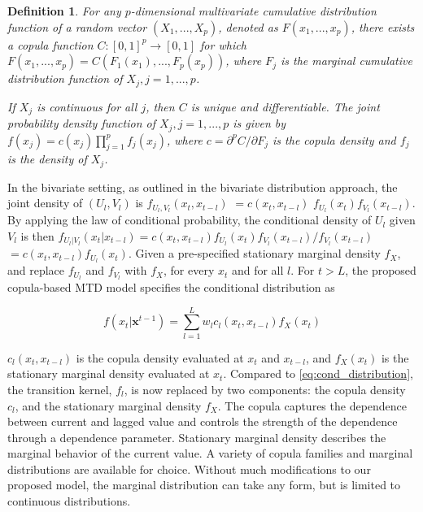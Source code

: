 \documentclass[
  letterpaper,
  double,
  12pt,
  1.0in]{beavtex}
\newtheorem{definition}{Definition}   %
\begin{document}
\begin{definition}
For any $p$-dimensional multivariate cumulative distribution function of a random vector $(X_1, ..., X_p)$, denoted as $F(x_1, ..., x_p)$, there exists a copula function $C: {[0,1]}^p \rightarrow [0, 1]$ for which $F(x_1, ..., x_p) = C(F_1(x_1), ..., F_p(x_p))$, where $F_j$ is the marginal cumulative distribution function of $X_j, j = 1,..., p$.

If $X_j$ is continuous for all $j$, then $C$ is unique and differentiable. The joint probability density function of $X_j, j=1,...,p$ is given by $f(x_j) = c(x_j) \prod_{j=1}^p f_j(x_j)$, where $c = \partial^p{C} / \partial{F_j}$ is the copula density and $f_j$ is the density of $X_j$.
\label{def:copula}
\end{definition}

In the bivariate setting, as outlined in the bivariate distribution
approach, the joint density of \((U_l, V_l)\) is
\(f_{U_l, V_l} (x_t, x_{t-l})\) \(= c(x_t, x_{t-l})\)
\(f_{U_l}(x_t) f_{V_l}(x_{t-l})\). By applying the law of conditional
probability, the conditional density of \(U_l\) given \(V_l\) is then
\(f_{U_l | V_l}(x_t | x_{t-l}) = c(x_t, x_{t-l}) f_{U_l}(x_t) f_{V_l}(x_{t-l}) / f_{V_l}(x_{t-l})\)
\(= c(x_t, x_{t-l}) f_{U_l}(x_t)\). Given a pre-specified stationary
marginal density \(f_X\), and replace \(f_{U_l}\) and \(f_{V_l}\) with
\(f_X\), for every \(x_t\) and for all \(l\). For \(t > L\), the
proposed copula-based MTD model specifies the conditional distribution
as

\begin{equation}
f(x_t | \textbf{x}^{t-1}) = \sum_{l=1}^L w_l c_l (x_t, x_{t-l}) f_X(x_t)
\label{eq:cond_distribution_copula}
\end{equation}

\(c_l (x_t, x_{t-l})\) is the copula density evaluated at \(x_t\) and
\(x_{t-l}\), and \(f_X(x_t)\) is the stationary marginal density
evaluated at \(x_t\). Compared to \ref{eq:cond_distribution}, the
transition kernel, \(f_l\), is now replaced by two components: the
copula density \(c_l\), and the stationary marginal density \(f_X\). The
copula captures the dependence between current and lagged value and
controls the strength of the dependence through a dependence parameter.
Stationary marginal density describes the marginal behavior of the
current value. A variety of copula families and marginal distributions
are available for choice. Without much modifications to our proposed
model, the marginal distribution can take any form, but is limited to
continuous distributions.
\end{document}
